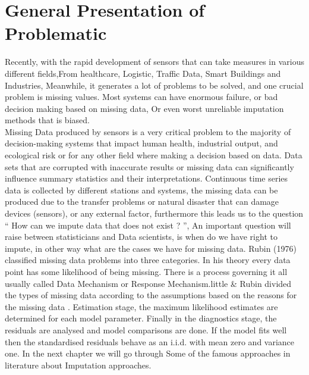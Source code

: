 \chapter*{General Presentation of Problematic} 
Recently, with the rapid development of  sensors that can take measures in various different fields,From healthcare, Logistic, Traffic Data, Smart Buildings and Industries, Meanwhile, it generates a lot of problems to be solved, and one crucial problem is missing values\cite{dempetrubin}. Most systems can have enormous failure, or bad decision making based on missing data, Or even worst unreliable imputation methods that is biased.\\Missing Data produced by sensors is a very  critical problem to the majority of decision-making systems that impact human health, industrial output, and ecological risk or for any other field where making a decision based on data. Data sets that are corrupted with inaccurate results or missing data can significantly influence summary statistics and their interpretations. Continuous time series data is collected by different stations and systems, the missing data can be produced due to the transfer problems or natural disaster that can damage devices (sensors), or any external factor, furthermore this leads us to the question “ How can we impute data that does not exist ? ”, An important question will raise between statisticians and Data scientists, is when do we have right to impute, in other way what are the cases we have for missing data. Rubin (1976) \cite{rubin} classified missing data problems into three categories. In his theory every data point has some likelihood of being missing. There is a process governing it all usually called Data Mechanism or Response Mechanism.little \& Rubin divided the types of missing data according to the assumptions based on the reasons for the missing data \cite{}.
Estimation stage, the maximum likelihood estimates are determined for each model parameter. Finally in the diagnostics stage, the residuals are analysed and model comparisons are done. If the model fits well then the standardised residuals behave as an i.i.d. with mean zero and variance one.
In the next chapter we will go through Some of the famous approaches in  literature about Imputation approaches.







